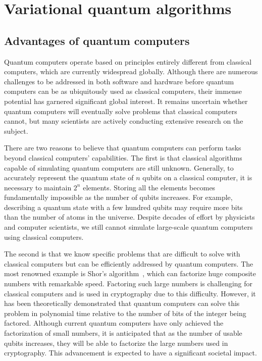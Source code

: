 \documentclass[12pt,dvipdfmx,twoside,openright]{report}
\begin{document}
\cleardoublepage
\chapter{Variational quantum algorithms}
\section{Advantages of quantum computers}
Quantum computers operate based on principles entirely different from classical computers, which are currently widespread globally.
Although there are numerous challenges to be addressed in both software and hardware before quantum computers can be as ubiquitously used as classical computers, their immense potential has garnered significant global interest. 
It remains uncertain whether quantum computers will eventually solve problems that classical computers cannot, but many scientists are actively conducting extensive research on the subject.

There are two reasons to believe that quantum computers can perform tasks beyond classical computers' capabilities.
The first is that classical algorithms capable of simulating quantum computers are still unknown.
Generally, to accurately represent the quantum state of $n$ qubits on a classical computer, it is necessary to maintain $2^n$ elements.
Storing all the elements becomes fundamentally impossible as the number of qubits increases.
For example, describing a quantum state with a few hundred qubits may require more bits than the number of atoms in the universe.
Despite decades of effort by physicists and computer scientists, we still cannot simulate large-scale quantum computers using classical computers.

The second is that we know specific problems that are difficult to solve with classical computers but can be efficiently addressed by quantum computers.
The most renowned example is Shor's algorithm~\cite{shor1994algorithms}, which can factorize huge composite numbers with remarkable speed.
Factoring such large numbers is challenging for classical computers and is used in cryptography due to this difficulty.
However, it has been theoretically demonstrated that quantum computers can solve this problem in polynomial time relative to the number of bits of the integer being factored.
Although current quantum computers have only achieved the factorization of small numbers, it is anticipated that as the number of usable qubits increases, they will be able to factorize the large numbers used in cryptography.
This advancement is expected to have a significant societal impact.
\end{document}
